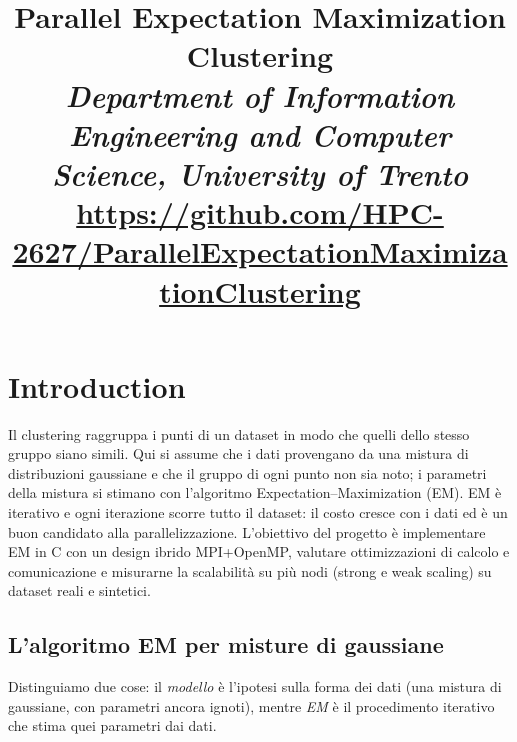 \documentclass[conference]{IEEEtran}
\begin{document}
\title{Parallel Expectation Maximization Clustering\\
{\normalsize\normalfont\itshape Department of Information Engineering and Computer Science, University of Trento}\\
{\normalsize\normalfont\url{https://github.com/HPC-2627/ParallelExpectationMaximizationClustering}}}

\author{
\and
{}
}

\maketitle

\begin{abstract}
\end{abstract}

\begin{IEEEkeywords}
\end{IEEEkeywords}

\section{Introduction}
Il clustering raggruppa i punti di un dataset in modo che quelli dello stesso gruppo siano simili. Qui si assume che i dati provengano da una mistura di distribuzioni gaussiane e che il gruppo di ogni punto non sia noto; i parametri della mistura si stimano con l'algoritmo Expectation--Maximization (EM). EM è iterativo e ogni iterazione scorre tutto il dataset: il costo cresce con i dati ed è un buon candidato alla parallelizzazione. L'obiettivo del progetto è implementare EM in C con un design ibrido MPI+OpenMP, valutare ottimizzazioni di calcolo e comunicazione e misurarne la scalabilità su più nodi (strong e weak scaling) su dataset reali e sintetici.

\subsection{L'algoritmo EM per misture di gaussiane}
Distinguiamo due cose: il \emph{modello} è l'ipotesi sulla forma dei dati (una mistura di gaussiane, con parametri ancora ignoti), mentre \emph{EM} è il procedimento iterativo che stima quei parametri dai dati.
\end{document}
